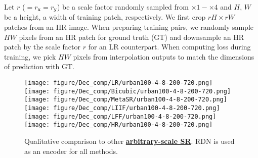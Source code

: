\documentclass[10pt,twocolumn,letterpaper]{article}
\begin{document}
Let $r$ ($=r_{\mathbf x}=r_{\mathbf y}$) be a scale factor randomly sampled from $\times1-\times4$ and $H$, $W$ be a height, a width of training patch, respectively. We first crop $rH\times rW$ patches from an HR image. When preparing training pairs, we randomly sample $HW$ pixels from an HR patch for ground truth (GT) and downsample an HR patch by the scale factor $r$ for an LR counterpart. When computing loss during training, we pick $HW$ pixels from interpolation outputs to match the dimensions of prediction with GT.


\begin{figure*}[t]
\footnotesize
\centering
{}
\texttt{[image: figure/Dec\_comp/LR/urban100-4-8-200-720.png]}
\texttt{[image: figure/Dec\_comp/Bicubic/urban100-4-8-200-720.png]}
\texttt{[image: figure/Dec\_comp/MetaSR/urban100-4-8-200-720.png]}
\texttt{[image: figure/Dec\_comp/LIIF/urban100-4-8-200-720.png]}
\texttt{[image: figure/Dec\_comp/LFF/urban100-4-8-200-720.png]}
\texttt{[image: figure/Dec\_comp/HR/urban100-4-8-200-720.png]}








\vspace*{-6pt}
\caption{Qualitative comparison to other \underline{\textbf{arbitrary-scale SR}}. RDN \cite{zhang2018residual} is used as an encoder for all methods.}
\label{fig:Qual_dec_ext}
\end{figure*}
\end{document}
